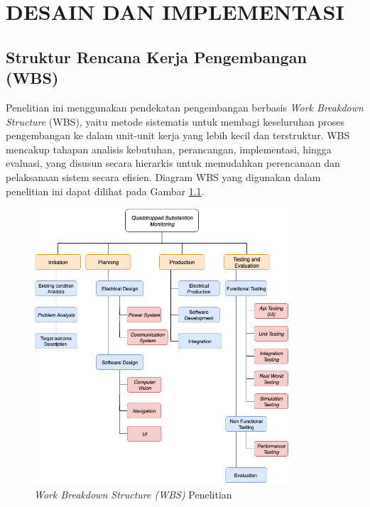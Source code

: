 \chapter{DESAIN DAN IMPLEMENTASI}
\label{chap:desainimplementasi}




\section{Struktur Rencana Kerja Pengembangan (WBS)}
\sloppy
Penelitian ini menggunakan pendekatan pengembangan berbasis \emph{Work Breakdown Structure} (WBS), yaitu metode sistematis untuk membagi keseluruhan proses pengembangan ke dalam unit-unit kerja yang lebih kecil dan terstruktur. WBS mencakup tahapan analisis kebutuhan, perancangan, implementasi, hingga evaluasi, yang disusun secara hierarkis untuk memudahkan perencanaan dan pelaksanaan sistem secara efisien. Diagram WBS yang digunakan dalam penelitian ini dapat dilihat pada Gambar \ref{fig:wbs}.

\begin{figure}[H]
  \centering
  \includegraphics[width=0.85\textwidth]{gambar/bab3/wbs-ta.png}
  \caption{\emph{Work Breakdown Structure (WBS)} Penelitian}
  \label{fig:wbs}
\end{figure}

